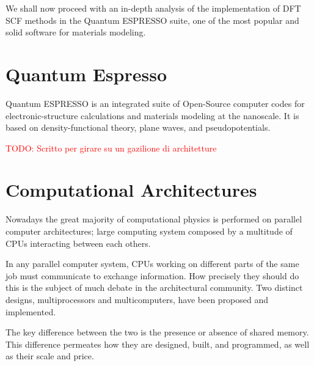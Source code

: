\documentclass[a4paper,12pt]{article}
\newcommand\mynotes[1]{\begin{flushright}

\textcolor{red}{TODO: #1}\end{flushright}}
\begin{document}
\newpage








We shall now proceed with an in-depth analysis of the implementation of DFT SCF methods in the Quantum ESPRESSO suite, one of the most popular and solid software for materials modeling.







\section{Quantum Espresso}\label{sec:QE}

Quantum ESPRESSO is an integrated suite of Open-Source computer codes for electronic-structure calculations and materials modeling at the nanoscale.
It is based on density-functional theory, plane waves, and pseudopotentials.

\mynotes{Scritto per girare su un gazilione di architetture}











\section{Computational Architectures} \label{comparch:sec}

Nowadays the great majority of computational physics is performed on parallel computer architectures; large computing system composed by a multitude of CPUs interacting between each others.

In any parallel computer system, CPUs working on different parts of the same job must communicate to exchange information. How precisely they should do this is the subject of much debate in the architectural community. 
Two distinct designs, multiprocessors and multicomputers, have been proposed and implemented.

The key difference between the two is the presence or absence of shared memory.
This difference permeates how they are designed, built, and programmed, as well as their scale and price\cite[p.586]{Tanenbaum}.
\end{document}
